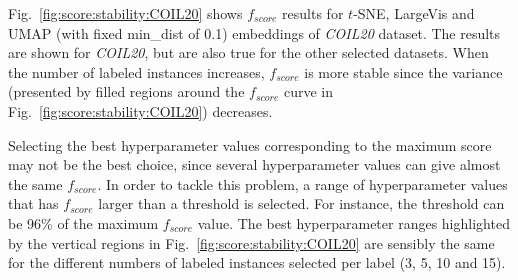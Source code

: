 Fig.~\ref{fig:score:stability:COIL20} shows $f_{score}$ results for $t$-SNE, LargeVis and UMAP (with fixed {min\_dist} of 0.1) embeddings of \emph{COIL20} dataset.
The results are shown for \emph{COIL20}, but are also true for the other selected datasets.
When the number of labeled instances increases, $f_{score}$ is more stable since the variance (presented by filled regions around the $f_{score}$ curve in Fig.~\ref{fig:score:stability:COIL20}) decreases.

Selecting the best hyperparameter values corresponding to the maximum score may not be the best choice, since several hyperparameter values can give almost the same $f_{score}$.
In order to tackle this problem, a range of hyperparameter values that has $f_{score}$ larger than a threshold is selected.
For instance, the threshold can be 96\% of the maximum $f_{score}$ value.
The best hyperparameter ranges highlighted by the vertical regions in Fig.~\ref{fig:score:stability:COIL20} are sensibly the same for the different numbers of labeled instances selected per label (3, 5, 10 and 15).


